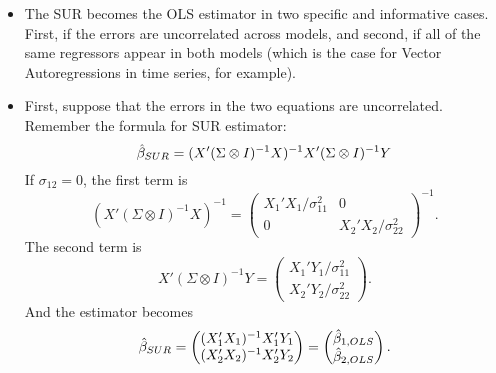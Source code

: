 \begin{itemize}[leftmargin=0pt]

\item The SUR becomes the OLS estimator in two specific and
  informative cases. First, if the errors are uncorrelated across
  models, and second, if all of the same regressors appear in both
  models (which is the case for Vector Autoregressions in time series,
  for example).

\item First, suppose that the errors in the two equations are
  uncorrelated. Remember the formula for SUR estimator:
  \begin{equation*}
    \hat{\beta}_{SUR} = (X'(\Sigma \otimes I)^{-1}X)^{-1}X'(\Sigma \otimes I)^{-1}Y
  \end{equation*}
  If $\sigma_{12} = 0$, the first term is
  \begin{equation*}
    (X'( \Sigma \otimes I)^{-1} X)^{-1} =
    \begin{pmatrix}
      X_1'X_1 / \sigma_{11}^2 & 0 \\ 0 & X_2'X_2 / \sigma_{22}^2
    \end{pmatrix}^{-1}.
  \end{equation*}
  The second term is
  \begin{equation*}
    X'(\Sigma \otimes I)^{-1}Y =
    \begin{pmatrix}      
      X_1' Y_1 / \sigma_{11}^2 \\ X_2'Y_2 / \sigma_{22}^2
    \end{pmatrix}.
  \end{equation*}
  And the estimator becomes
  \begin{equation*}
    \hat{\beta}_{SUR} =
    \begin{pmatrix}
      (X_1'X_1)^{-1}X_1'Y_1 \\ (X_2'X_2)^{-1}X_2'Y_2
    \end{pmatrix}
    =
    \begin{pmatrix}
      \hat{\beta}_{1,OLS} \\ \hat{\beta}_{2,OLS}
    \end{pmatrix}.
  \end{equation*}


\end{itemize}

